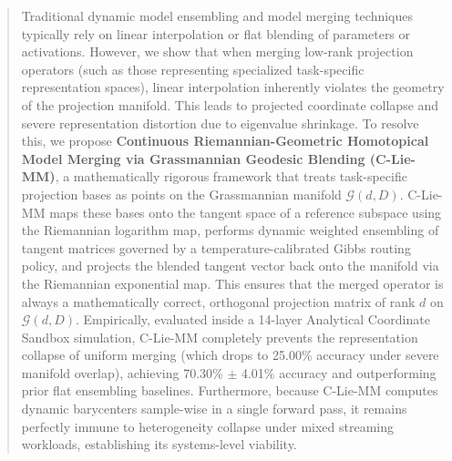 \begin{abstract}
Traditional dynamic model ensembling and model merging techniques typically rely on linear interpolation or flat blending of parameters or activations. However, we show that when merging low-rank projection operators (such as those representing specialized task-specific representation spaces), linear interpolation inherently violates the geometry of the projection manifold. This leads to projected coordinate collapse and severe representation distortion due to eigenvalue shrinkage. To resolve this, we propose \textbf{Continuous Riemannian-Geometric Homotopical Model Merging via Grassmannian Geodesic Blending (C-Lie-MM)}, a mathematically rigorous framework that treats task-specific projection bases as points on the Grassmannian manifold $\mathcal{G}(d, D)$. C-Lie-MM maps these bases onto the tangent space of a reference subspace using the Riemannian logarithm map, performs dynamic weighted ensembling of tangent matrices governed by a temperature-calibrated Gibbs routing policy, and projects the blended tangent vector back onto the manifold via the Riemannian exponential map. This ensures that the merged operator is always a mathematically correct, orthogonal projection matrix of rank $d$ on $\mathcal{G}(d, D)$. Empirically, evaluated inside a 14-layer Analytical Coordinate Sandbox simulation, C-Lie-MM completely prevents the representation collapse of uniform merging (which drops to 25.00\% accuracy under severe manifold overlap), achieving 70.30\% $\pm$ 4.01\% accuracy and outperforming prior flat ensembling baselines. Furthermore, because C-Lie-MM computes dynamic barycenters sample-wise in a single forward pass, it remains perfectly immune to heterogeneity collapse under mixed streaming workloads, establishing its systems-level viability.
\end{abstract}

